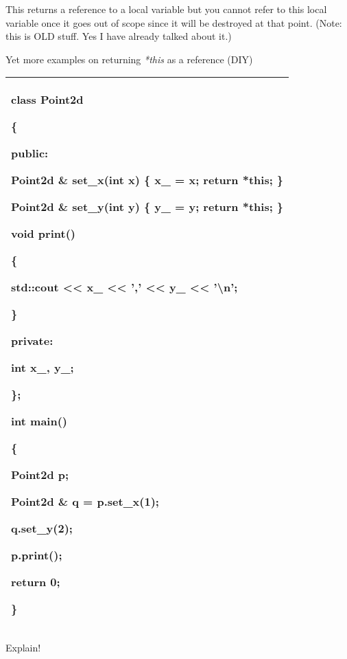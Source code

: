 \documentclass[
]{article}
\begin{document}
This returns a reference to a local variable but you cannot refer to
this local variable once it goes out of scope since it will be destroyed
at that point. (Note: this is OLD stuff. Yes I have already talked about
it.)

Yet more examples on returning \emph{*this} as a reference (DIY)

\begin{longtable}[]{@{}l@{}}
\toprule
\endhead
\begin{minipage}[t]{0.97\columnwidth}\raggedright
class Point2d

\{

public:

Point2d \& set\_x(int x) \{ x\_ = x; return *this; \}

Point2d \& set\_y(int y) \{ y\_ = y; return *this; \}

void print()

\{

std::cout \textless\textless{} x\_ \textless\textless{} ','
\textless\textless{} y\_ \textless\textless{} '\textbackslash n';

\}

private:

int x\_, y\_;

\};

int main()

\{

Point2d p;

Point2d \& q = p.set\_x(1);

q.set\_y(2);

p.print();

return 0;

\}\strut
\end{minipage}\tabularnewline
\bottomrule
\end{longtable}

Explain!
\end{document}
